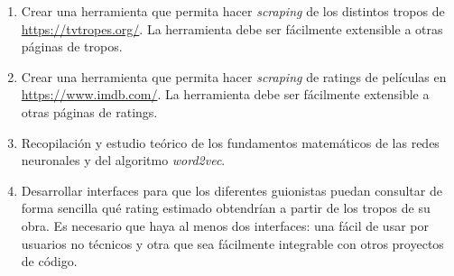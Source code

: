 \begin{enumerate}
      \item \label{obj:1} Crear una herramienta que permita hacer \textit{scraping} de los distintos
            tropos de \url{https://tvtropes.org/}. La herramienta debe ser fácilmente extensible a
            otras páginas de tropos.
      \item \label{obj:2} Crear una herramienta que permita hacer \textit{scraping} de ratings de
            películas en \url{https://www.imdb.com/}. La herramienta debe ser fácilmente extensible a
            otras páginas de ratings.
      \item \label{obj:3} Recopilación y estudio teórico de los fundamentos matemáticos de las redes
            neuronales y del algoritmo \textit{word2vec}.
      \item \label{obj:4} Desarrollar interfaces para que los diferentes guionistas puedan consultar
            de forma sencilla qué rating estimado obtendrían a partir de los tropos de su obra. Es necesario
            que haya al menos dos interfaces: una fácil de usar por usuarios no técnicos y otra que sea
            fácilmente integrable con otros proyectos de código.
\end{enumerate}
